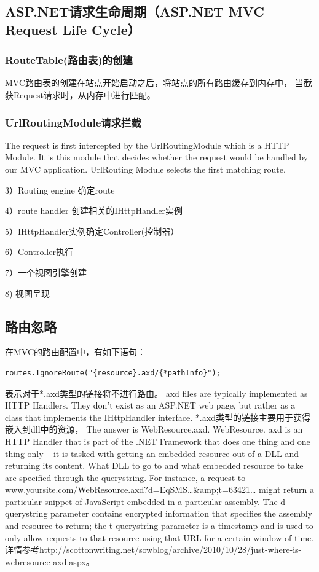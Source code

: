 \documentclass{book}
\begin{document}
\subsection{ASP.NET请求生命周期（ASP.NET MVC Request Life Cycle）}

\subsubsection{RouteTable(路由表)的创建}

MVC路由表的创建在站点开始启动之后，将站点的所有路由缓存到内存中，
当截获Request请求时，从内存中进行匹配。

\subsubsection{UrlRoutingModule请求拦截}

The request is first intercepted by the UrlRoutingModule which is a HTTP Module. 
It is this module that decides whether the request would be handled by our MVC application. UrlRouting Module selects the first matching route. 

3）Routing engine 确定route

4）route handler 创建相关的IHttpHandler实例

5）IHttpHandler实例确定Controller(控制器）

6）Controller执行

7）一个视图引擎创建

8) 视图呈现

\subsection{路由忽略}

在MVC的路由配置中，有如下语句：

\begin{lstlisting}[language={[Sharp]C}]
routes.IgnoreRoute("{resource}.axd/{*pathInfo}");
\end{lstlisting}

表示对于*.axd类型的链接将不进行路由。
axd files are typically implemented as HTTP Handlers. 
They don't exist as an ASP.NET web page, 
but rather as a class that implements the IHttpHandler interface.
*.axd类型的链接主要用于获得嵌入到dll中的资源，
The answer is WebResource.axd. WebResource.
axd is an HTTP Handler that is part of the .NET Framework that does one 
thing and one thing only – it is tasked with getting an 
embedded resource out of a DLL and returning its content. 
What DLL to go to and what embedded resource to take are specified through the querystring. 
For instance, a request to www.yoursite.com/WebResource.axd?d=EqSMS…\&amp;t=63421… might return a particular snippet of JavaScript embedded in a particular assembly. 
The d querystring parameter contains encrypted information that specifies the assembly and resource to return; 
the t querystring parameter is a timestamp and is used to only allow 
requests to that resource using that URL for a certain window of time.
详情参考\url{http://scottonwriting.net/sowblog/archive/2010/10/28/just-where-is-webresource-axd.aspx}。
\end{document}
